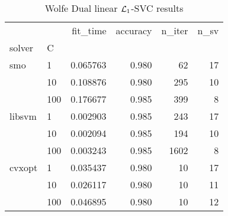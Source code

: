 \begin{table}[H]
\centering
\caption{Wolfe Dual linear $\protect \mathcal{L}_1$-SVC results}
\label{linear_dual_l1_svc_cv_results}
\begin{tabular}{llrrrr}
\toprule
       &     &  fit\_time &  accuracy &  n\_iter &  n\_sv \\
solver & C &           &           &         &       \\
\midrule
smo & 1   &  0.065763 &     0.980 &      62 &    17 \\
       & 10  &  0.108876 &     0.980 &     295 &    10 \\
       & 100 &  0.176677 &     0.985 &     399 &     8 \\
libsvm & 1   &  0.002903 &     0.985 &     243 &    17 \\
       & 10  &  0.002094 &     0.985 &     194 &    10 \\
       & 100 &  0.003243 &     0.985 &    1602 &     8 \\
cvxopt & 1   &  0.035437 &     0.980 &      10 &    17 \\
       & 10  &  0.026117 &     0.980 &      10 &    11 \\
       & 100 &  0.046895 &     0.980 &      10 &    12 \\
\bottomrule
\end{tabular}
\end{table}
